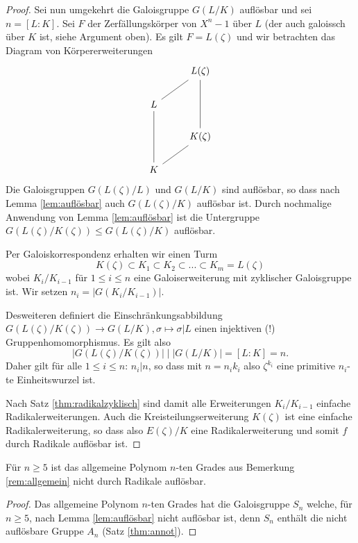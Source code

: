 \documentclass{book}
\begin{document}
\begin{proof}
    Sei nun umgekehrt die Galoisgruppe $G(L/K)$ auflösbar und sei $n = [L:K]$.
    Sei $F$ der Zerfällungskörper von $X^n -1 $ über $L$ (der auch
    galoissch über $K$ ist, siehe Argument oben). Es gilt $F = L(\zeta)$ und
    wir betrachten das Diagram von Körpererweiterungen
    \[
    \begin{tikzcd}
            & L(\zeta)\\
         L\ar[dash]{ur}    & \\
         &  K(\zeta) \ar[dash]{uu}\\
        K \ar[dash]{ur}\ar[dash]{uu} & 
    \end{tikzcd}
    \]
    Die Galoisgruppen $G(L(\zeta)/L)$ und $G(L/K)$ sind auflösbar, so dass nach
    Lemma \ref{lem:auflösbar} auch $G(L(\zeta)/K)$ auflösbar ist. Durch
    nochmalige Anwendung von Lemma \ref{lem:auflösbar} ist die Untergruppe
    $G(L(\zeta)/K(\zeta)) \le G(L(\zeta)/K)$ auflösbar. 

    Per Galoiskorrespondenz erhalten wir einen Turm
    \[
        K(\zeta) \subset K_1 \subset K_2 \subset ... \subset K_m = L(\zeta)
    \]
    wobei $K_i/K_{i-1}$ für $1 \le i \le n$ eine Galoiserweiterung mit
    zyklischer Galoisgruppe ist. Wir setzen $n_i = |G(K_i/K_{i-1})|$. 

    Desweiteren definiert die Einschränkungsabbildung $G(L(\zeta)/K(\zeta)) \to
    G(L/K), \sigma \mapsto \sigma|L$ einen injektiven (!) Gruppenhomomorphismus. Es gilt also 
    \[
        |G(L(\zeta)/K(\zeta))| \mid |G(L/K)| = [L:K] = n.
    \]
    Daher gilt für alle $1 \le i \le n$: $n_i | n$, so dass mit $n = n_i k_i$
    also $\zeta^{k_i}$ eine primitive $n_i$-te Einheitswurzel ist. 

    Nach Satz \ref{thm:radikalzyklisch} sind damit alle Erweiterungen
    $K_i/K_{i-1}$ einfache Radikalerweiterungen. Auch die
    Kreisteilungserweiterung $K(\zeta)$ ist eine einfache Radikalerweiterung,
    so dass also $E(\zeta)/K$ eine Radikalerweiterung und somit $f$ durch Radikale auflösbar ist. 
\end{proof}

\begin{cor}
    \label{cor:allg}
    Für $n \ge 5$ ist das allgemeine Polynom $n$-ten Grades aus Bemerkung
    \ref{rem:allgemein} nicht durch Radikale auflösbar. 
\end{cor}
\begin{proof}
    Das allgemeine Polynom $n$-ten Grades hat die Galoisgruppe $S_n$ welche, für
    $n \ge 5$, nach Lemma \ref{lem:auflösbar} nicht auflösbar ist, denn $S_n$
    enthält die nicht auflösbare Gruppe $A_n$ (Satz \ref{thm:annot}).
\end{proof}
\end{document}
